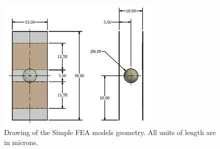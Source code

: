 \begin{figure}
    \centering
    \includegraphics[width=0.7\textwidth]{images/simple_cell_drawing_inventor.png}
    \caption[Simple FEA model geometry.]{Drawing of the Simple FEA models geometry. All units of length are in microns.}
    \label{fig:simple_model_geometry}
\end{figure}


